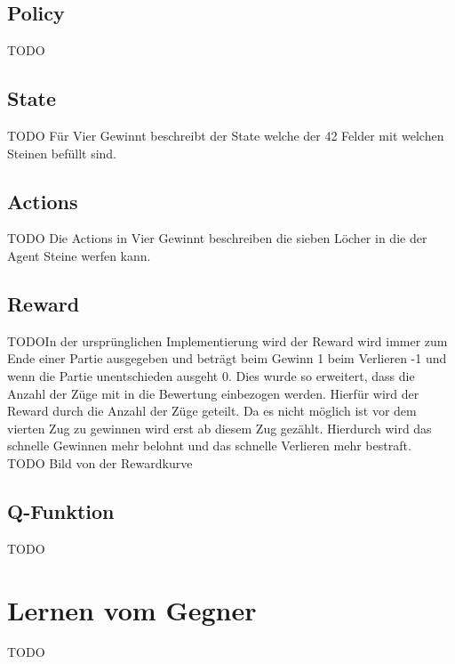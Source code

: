 \subsection{Policy}
\colorbox{red!30}{TODO}

\subsection{State}
\colorbox{red!30}{TODO} Für Vier Gewinnt beschreibt der State welche der 42 Felder mit welchen Steinen befüllt sind. 

\subsection{Actions}
\colorbox{red!30}{TODO} Die Actions in Vier Gewinnt beschreiben die sieben Löcher in die der Agent Steine werfen kann.

\subsection{Reward}
\colorbox{red!30}{TODO}In der ursprünglichen Implementierung wird der Reward wird immer zum Ende einer Partie ausgegeben und beträgt beim Gewinn 1 beim Verlieren -1 und wenn die Partie unentschieden ausgeht 0.
Dies wurde so erweitert, dass die Anzahl der Züge mit in die Bewertung einbezogen werden. Hierfür wird der Reward durch die Anzahl der Züge geteilt. Da es nicht möglich ist vor dem vierten Zug zu gewinnen wird erst ab diesem Zug gezählt.
Hierdurch wird das schnelle Gewinnen mehr belohnt und das schnelle Verlieren mehr bestraft. \\
\colorbox{red!30}{TODO Bild von der Rewardkurve} 


\subsection{Q-Funktion}
\colorbox{red!30}{TODO} %

\section{Lernen vom Gegner}
\colorbox{red!30}{TODO}